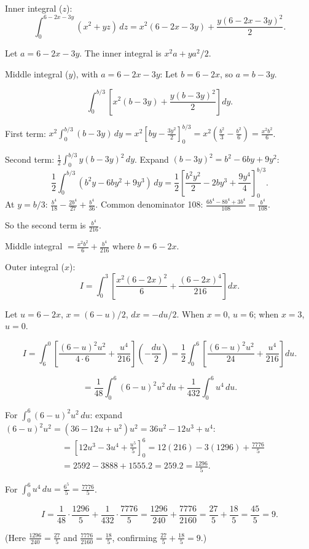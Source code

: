 \begin{enumerate}
Inner integral ($z$):
\[
\int_0^{6-2x-3y}(x^2+yz)\,dz = x^2(6-2x-3y)+\frac{y(6-2x-3y)^2}{2}.
\]

Let $a = 6-2x-3y$. The inner integral is $x^2 a + ya^2/2$.

Middle integral ($y$), with $a = 6-2x-3y$: Let $b = 6-2x$, so $a = b-3y$.

\[
\int_0^{b/3}\left[x^2(b-3y)+\frac{y(b-3y)^2}{2}\right]dy.
\]

First term: $x^2\int_0^{b/3}(b-3y)\,dy = x^2\left[by-\frac{3y^2}{2}\right]_0^{b/3} = x^2\left(\frac{b^2}{3}-\frac{b^2}{6}\right) = \frac{x^2 b^2}{6}$.

Second term: $\frac{1}{2}\int_0^{b/3}y(b-3y)^2\,dy$. Expand $(b-3y)^2 = b^2-6by+9y^2$:
\[
\frac{1}{2}\int_0^{b/3}(b^2 y-6by^2+9y^3)\,dy = \frac{1}{2}\left[\frac{b^2 y^2}{2}-2by^3+\frac{9y^4}{4}\right]_0^{b/3}.
\]
At $y=b/3$: $\frac{b^4}{18}-\frac{2b^4}{27}+\frac{b^4}{36}$. Common denominator 108: $\frac{6b^4-8b^4+3b^4}{108} = \frac{b^4}{108}$.

So the second term is $\frac{b^4}{216}$.

Middle integral $= \frac{x^2 b^2}{6}+\frac{b^4}{216}$ where $b = 6-2x$.

Outer integral ($x$):
\[
I = \int_0^3\left[\frac{x^2(6-2x)^2}{6}+\frac{(6-2x)^4}{216}\right]dx.
\]

Let $u = 6-2x$, $x = (6-u)/2$, $dx = -du/2$. When $x=0$, $u=6$; when $x=3$, $u=0$.

\[
I = \int_6^0\left[\frac{(6-u)^2 u^2}{4\cdot 6}+\frac{u^4}{216}\right]\left(-\frac{du}{2}\right) = \frac{1}{2}\int_0^6\left[\frac{(6-u)^2 u^2}{24}+\frac{u^4}{216}\right]du.
\]

\[
= \frac{1}{48}\int_0^6(6-u)^2 u^2\,du + \frac{1}{432}\int_0^6 u^4\,du.
\]

For $\int_0^6(6-u)^2 u^2\,du$: expand $(6-u)^2 u^2 = (36-12u+u^2)u^2 = 36u^2-12u^3+u^4$:
\begin{align*}
&= \left[12u^3-3u^4+\frac{u^5}{5}\right]_0^6 = 12(216)-3(1296)+\frac{7776}{5} \\
&= 2592-3888+1555.2 = 259.2 = \frac{1296}{5}.
\end{align*}

For $\int_0^6 u^4\,du = \frac{6^5}{5} = \frac{7776}{5}$.

\[
I = \frac{1}{48}\cdot\frac{1296}{5}+\frac{1}{432}\cdot\frac{7776}{5} = \frac{1296}{240}+\frac{7776}{2160} = \frac{27}{5}+\frac{18}{5} = \frac{45}{5} = \boxed{9}.
\]

(Here $\frac{1296}{240} = \frac{27}{5}$ and $\frac{7776}{2160} = \frac{18}{5}$, confirming $\frac{27}{5}+\frac{18}{5} = 9$.)


\end{enumerate}
